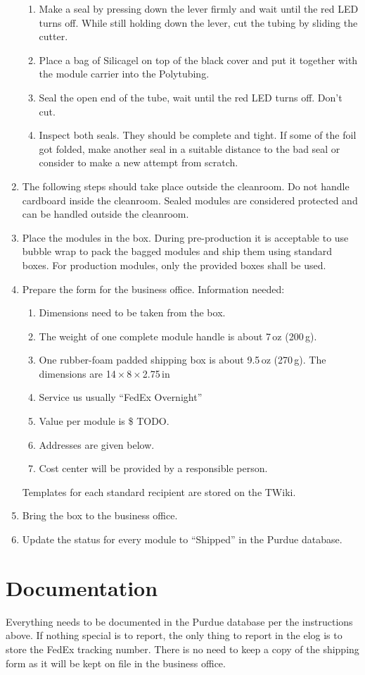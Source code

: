 \documentclass[12pt]{unlsilabsop}
\begin{document}
\begin{enumerate}
\begin{enumerate}
        \item Make a seal by pressing down the lever firmly and wait until the red LED turns off. While still holding down the lever, cut the tubing by sliding the cutter.
        \item Place a bag of Silicagel on top of the black cover and put it together with the module carrier into the Polytubing.
        \item Seal the open end of the tube, wait until the red LED turns off. Don't cut.
        \item Inspect both seals. They should be complete and tight. If some of the foil got folded, make another seal in a suitable distance to the bad seal or consider to make a new attempt from scratch.
    \end{enumerate}
    \item The following steps should take place outside the cleanroom. Do not handle cardboard inside the cleanroom. Sealed modules are considered protected and can be handled outside the cleanroom.
    \item Place the modules in the box. During pre-production it is acceptable to use bubble wrap to pack the bagged modules and ship them using standard boxes. For production modules, only the provided boxes shall be used.
    \item Prepare the form for the business office. Information needed:
    \begin{enumerate}
        \item Dimensions need to be taken from the box.
        \item The weight of one complete module handle is about 7\,oz (200\,g).
        \item One rubber-foam padded shipping box is about 9.5\,oz (270\,g). The dimensions are 14\,$\times$\,8\,$\times$\,2.75\,in
        \item Service us usually ``FedEx Overnight''
        \item Value per module is \$ TODO.
        \item Addresses are given below.
        \item Cost center will be provided by a responsible person.
    \end{enumerate}
    Templates for each standard recipient are stored on the TWiki.
    \item Bring the box to the business office. 
    \item Update the status for every module to ``Shipped'' in the Purdue database.
\end{enumerate}

\section{Documentation}
Everything needs to be documented in the Purdue database per the instructions above. If nothing special is to report, the only thing to report in the elog is to store the FedEx tracking number. There is no need to keep a copy of the shipping form as it will be kept on file in the business office.
\end{document}
